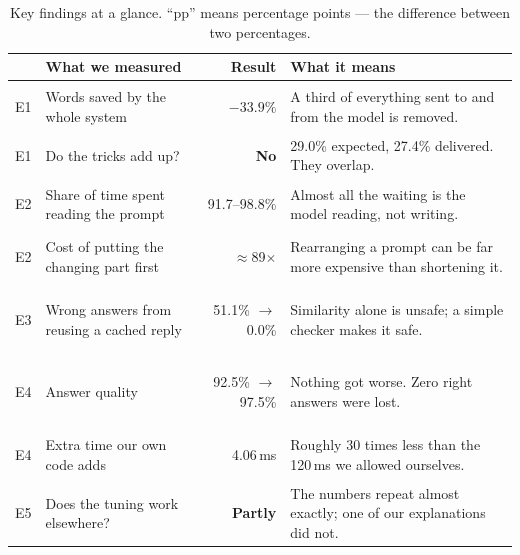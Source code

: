 \documentclass[11pt,a4paper]{article}
\newcommand{\hl}[1]{\colorbox{hlyellow}{\strut #1}}
\begin{document}
\begin{table}[htbp]
\centering
\caption{Key findings at a glance. ``pp'' means percentage points --- the
difference between two percentages.}
\label{tab:glance}
\footnotesize
\begin{tabularx}{\textwidth}{@{}c L{3.1cm} r X@{}}
\toprule
& \textbf{What we measured} & \textbf{Result} & \textbf{What it means} \\
\midrule
E1 & Words saved by the whole system & \hl{$-33.9\%$} &
     A third of everything sent to and from the model is removed. \\
E1 & Do the tricks add up? & \textbf{No} &
     29.0\% expected, 27.4\% delivered. They overlap. \\
E2 & Share of time spent reading the prompt & \hl{91.7--98.8\%} &
     Almost all the waiting is the model reading, not writing. \\
E2 & Cost of putting the changing part first & \hl{$\approx$89$\times$} &
     Rearranging a prompt can be far more expensive than shortening it. \\
E3 & Wrong answers from reusing a cached reply & \hl{51.1\% $\rightarrow$ 0.0\%} &
     Similarity alone is unsafe; a simple checker makes it safe. \\
E4 & Answer quality & \hl{92.5\% $\rightarrow$ 97.5\%} &
     Nothing got worse. Zero right answers were lost. \\
E4 & Extra time our own code adds & \hl{4.06\,ms} &
     Roughly 30 times less than the 120\,ms we allowed ourselves. \\
E5 & Does the tuning work elsewhere? & \textbf{Partly} &
     The numbers repeat almost exactly; one of our explanations did not. \\
\bottomrule
\end{tabularx}
\end{table}
\end{document}
